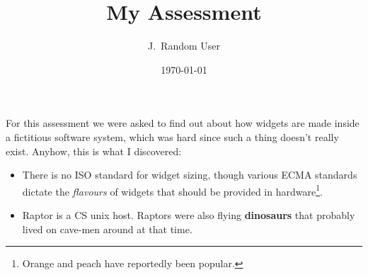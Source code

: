 \documentclass[a4paper,12pt]{article}
\begin{document}
\title{My Assessment}
\author{J.~Random User}
\date{\today}

\maketitle

For this assessment we were asked to find out about how
widgets are made inside a fictitious software system,
which was hard since such a thing doesn't really exist.
Anyhow, this is what I discovered:

\begin{itemize}
\item	There is no ISO standard for widget sizing,
	though various ECMA standards dictate the
	{\em flavours} of widgets that should be
	provided in hardware\footnote{Orange and peach
	have reportedly been popular.}.
\item	Raptor is a CS unix host.  Raptors were also
	flying {\bf dinosaurs} that probably lived on
	cave-men around at that time.
\end{itemize}
\end{document}
